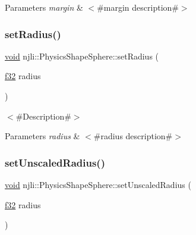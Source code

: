 \begin{DoxyParams}{Parameters}
{\em margin} & $<$\#margin description\#$>$ \\
\hline
\end{DoxyParams}
\mbox{\label{classnjli_1_1_physics_shape_sphere_ae014734c779ae780a981142cf8ae7f9d}} 
\subsubsection{\texorpdfstring{set\+Radius()}{setRadius()}}
{\footnotesize\ttfamily \mbox{\hyperlink{_thread_8h_af1e856da2e658414cb2456cb6f7ebc66}{void}} njli\+::\+Physics\+Shape\+Sphere\+::set\+Radius (\begin{DoxyParamCaption}\item[{\mbox{\hyperlink{_util_8h_a5f6906312a689f27d70e9d086649d3fd}{f32}}}]{radius }\end{DoxyParamCaption})}

$<$\#\+Description\#$>$


\begin{DoxyParams}{Parameters}
{\em radius} & $<$\#radius description\#$>$ \\
\hline
\end{DoxyParams}
\mbox{\label{classnjli_1_1_physics_shape_sphere_af38100684789bb68150f2b8ffb8389ff}} 
\subsubsection{\texorpdfstring{set\+Unscaled\+Radius()}{setUnscaledRadius()}}
{\footnotesize\ttfamily \mbox{\hyperlink{_thread_8h_af1e856da2e658414cb2456cb6f7ebc66}{void}} njli\+::\+Physics\+Shape\+Sphere\+::set\+Unscaled\+Radius (\begin{DoxyParamCaption}\item[{\mbox{\hyperlink{_util_8h_a5f6906312a689f27d70e9d086649d3fd}{f32}}}]{radius }\end{DoxyParamCaption})}

